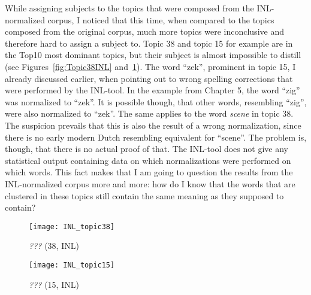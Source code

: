While assigning subjects to the topics that were composed from the INL-normalized corpus, I noticed that this time, when compared to the topics composed from the original corpus, much more topics were inconclusive and therefore hard to assign a subject to. Topic 38 and topic 15 for example are in the Top10 most dominant topics, but their subject is almost impossible to distill (see Figures~\ref{fig:Topic38INL} and~\ref{fig:Topic15INL}). The word \enquote{zek}, prominent in topic 15, I already discussed earlier, when pointing out to wrong spelling corrections that were performed by the INL-tool. In the example from Chapter 5, the word \enquote{zig} was normalized to \enquote{zek}. It is possible though, that other words, resembling \enquote{zig}, were also normalized to \enquote{zek}. The same applies to the word \textit{scene} in topic 38. The suspicion prevails that this is also the result of a wrong normalization, since there is no early modern Dutch resembling equivalent for \enquote{scene}. The problem is, though, that there is no actual proof of that. The INL-tool does not give any statistical output containing data on which normalizations were performed on which words. This fact makes that I am going to question the results from the INL-normalized corpus more and more: how do I know that the words that are clustered in these topics still contain the same meaning as they supposed to contain?

\begin{figure}
	\begin{minipage}[c]{0.48\linewidth}
		\texttt{[image: INL\_topic38]}
		\caption{\textit{???} (38, INL)}
		\label{fig:Topic38INL}
		\vspace{4ex}
	\end{minipage}%
	\begin{minipage}[c]{0.48\linewidth}
		\texttt{[image: INL\_topic15]}
		\caption{\textit{???} (15, INL)}
		\label{fig:Topic15INL}
		\vspace{4ex}
	\end{minipage}%
\end{figure}

